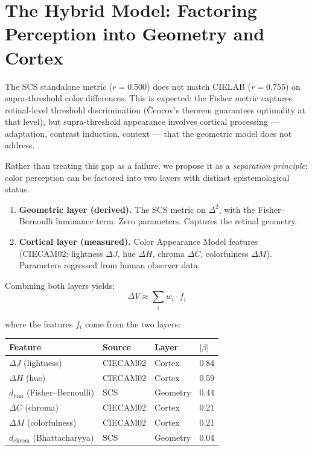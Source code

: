 \documentclass[12pt,a4paper]{article}
\begin{document}
\section{The Hybrid Model: Factoring Perception into Geometry and Cortex}
\label{sec:hybrid}

The SCS standalone metric ($r = 0.500$) does not match CIELAB
($r = 0.755$) on supra-threshold color differences. This is expected:
the Fisher metric captures retinal-level threshold discrimination
(\v{C}encov's theorem guarantees optimality at that level), but
supra-threshold appearance involves cortical processing ---
adaptation, contrast induction, context --- that the geometric model
does not address.

Rather than treating this gap as a failure, we propose it as a
\emph{separation principle}: color perception can be factored into
two layers with distinct epistemological status.

\begin{enumerate}[nosep]
\item \textbf{Geometric layer (derived).} The SCS metric on
  $\Delta^2$, with the Fisher--Bernoulli luminance term. Zero
  parameters. Captures the retinal geometry.
\item \textbf{Cortical layer (measured).} Color Appearance Model
  features (CIECAM02: lightness $\Delta J$, hue $\Delta H$, chroma
  $\Delta C$, colorfulness $\Delta M$). Parameters regressed from
  human observer data.
\end{enumerate}

Combining both layers yields:
\begin{equation}
\Delta V \approx \sum_i w_i \cdot f_i
\end{equation}

where the features $f_i$ come from the two layers:

\begin{center}
\begin{tabular}{llll}
\toprule
Feature & Source & Layer & $|\beta|$ \\
\midrule
$\Delta J$ (lightness) & CIECAM02 & Cortex & 0.84 \\
$\Delta H$ (hue) & CIECAM02 & Cortex & 0.59 \\
$d_{\mathrm{lum}}$ (Fisher--Bernoulli) & SCS & Geometry & 0.44 \\
$\Delta C$ (chroma) & CIECAM02 & Cortex & 0.21 \\
$\Delta M$ (colorfulness) & CIECAM02 & Cortex & 0.21 \\
$d_{\mathrm{chrom}}$ (Bhattacharyya) & SCS & Geometry & 0.04 \\
\bottomrule
\end{tabular}
\end{center}
\end{document}
